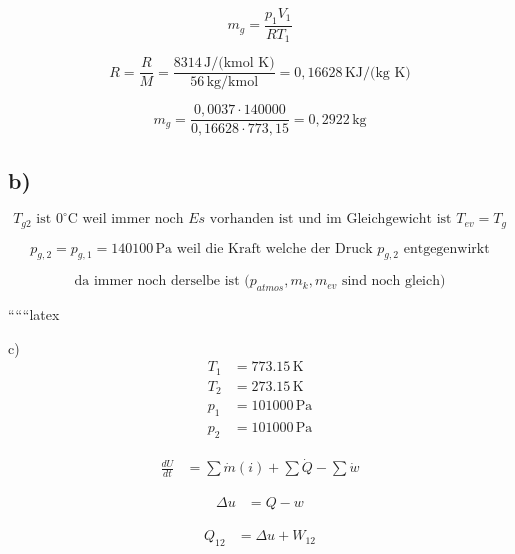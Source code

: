 \begin{equation*}
    m_g = \frac{p_1 V_1}{RT_1}
\end{equation*}

\begin{equation*}
    R = \frac{R}{M} = \frac{8314 \, \text{J/(kmol K)}}{56 \, \text{kg/kmol}} = 0,16628 \, \text{KJ/(kg K)}
\end{equation*}

\begin{equation*}
    m_g = \frac{0,0037 \cdot 140000}{0,16628 \cdot 773,15} = 0,2922 \, \text{kg}
\end{equation*}

\subsection*{b)}

\begin{equation*}
    T_{g2} \text{ ist } 0^\circ \text{C weil immer noch } Es \text{ vorhanden ist und im Gleichgewicht ist } T_{ev} = T_g
\end{equation*}

\begin{equation*}
    p_{g,2} = p_{g,1} = 140100 \, \text{Pa weil die Kraft welche der Druck } p_{g,2} \text{ entgegenwirkt}
\end{equation*}

\begin{equation*}
    \text{da immer noch derselbe ist (} p_{atmos}, m_k, m_{ev} \text{ sind noch gleich)}
\end{equation*}

``````latex


c)
\begin{align*}
    T_1 &= 773.15 \, \text{K} \\
    T_2 &= 273.15 \, \text{K} \\
    p_1 &= 101000 \, \text{Pa} \\
    p_2 &= 101000 \, \text{Pa}
\end{align*}

\begin{align*}
    \frac{dU}{dt} &= \sum \dot{m}(i) + \sum \dot{Q} - \sum \dot{w}
\end{align*}

\begin{align*}
    \Delta u &= Q - w
\end{align*}

\begin{align*}
    Q_{12} &= \Delta u + W_{12}
\end{align*}

